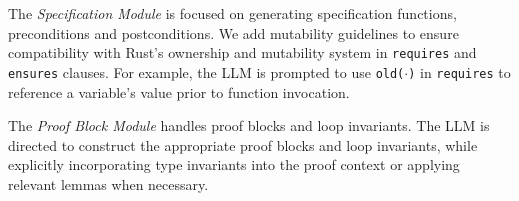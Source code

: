 The \textit{Specification Module} is focused on generating specification functions, preconditions and postconditions.  We add mutability guidelines to ensure compatibility with Rust’s ownership and mutability system in \texttt{requires} and \texttt{ensures} clauses. For example, the LLM is prompted to use \texttt{old($\cdot$)} in \texttt{requires} to reference a variable's value prior to function invocation. %

The \textit{Proof Block Module} handles proof blocks and loop invariants.  The LLM is directed to construct the appropriate proof blocks and loop invariants, while explicitly incorporating type invariants into the proof context or applying relevant lemmas when necessary. %










